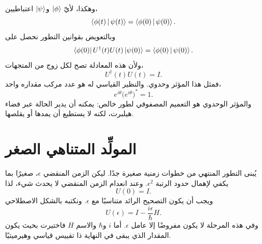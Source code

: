 وهكذا، لأيّ \(\left\lvert\phi\right\rangle\) و\(\left\lvert\psi\right\rangle\) اعتباطيين،
\begin{equation}
\left\langle\phi(t)\,\middle|\,\psi(t)\right\rangle
=
\left\langle\phi(0)\,\middle|\,\psi(0)\right\rangle.
\end{equation}
وبالتعويض بقوانين التطور نحصل على
\begin{equation}
\left\langle\phi(0)\right\rvert U^\dagger(t)U(t)\left\lvert\psi(0)\right\rangle
=
\left\langle\phi(0)\,\middle|\,\psi(0)\right\rangle.
\end{equation}
ولأن هذه المعادلة تصح لكل زوج من المتجهات،
\begin{equation}
\boxed{U^\dagger(t)U(t)=I}.
\end{equation}
فمثل هذا المؤثر وحدوي. والنظير القياسي له هو عدد مركب مقداره واحد،
\begin{equation}
e^{i\theta}\bigl(e^{i\theta}\bigr)^*=1.
\end{equation}
والمؤثر الوحدوي هو التعميم المصفوفي لطور خالص: يمكنه أن يدير الحالة عبر فضاء هيلبرت، لكنه لا يستطيع أن يمدها أو يقلصها.

\section{المولِّد المتناهي الصغر}

يُبنى التطور المنتهي من خطوات زمنية صغيرة جدًا. ليكن الزمن المنقضي \(\epsilon\)، صغيرًا بما يكفي لإهمال حدود الرتبة \(\epsilon^2\). وعند انعدام الزمن المنقضي لا يحدث شيء، لذا
\begin{equation}
U(0)=I.
\end{equation}
ويجب أن يكون التصحيح الرائد متناسبًا مع \(\epsilon\). ونكتبه بالشكل الاصطلاحي
\begin{equation}
\boxed{U(\epsilon)=I-\frac{i\epsilon}{\hbar}H}.
\end{equation}
وفي هذه المرحلة لا يكون مفروضًا إلا عامل \(\epsilon\). أما \(i\) و\(\hbar\) والاسم \(H\) فاختيرت بحيث يكون المقدار الذي يبقى في النهاية ذا تقييس قياسي وهيرميتيًا.

\begin{classroomqa}
\end{classroomqa}


